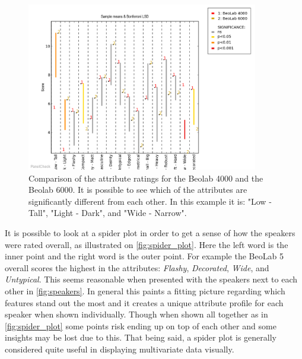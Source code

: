 \begin{figure}[H]
\centering
\includegraphics[width = 0.9\textwidth]{Figure/4000vs6000.png} 
\caption{Comparison of the attribute ratings for the Beolab 4000 and the Beolab 6000. It is possible to see which of the attributes are significantly different from each other. In this example it is: "Low - Tall", "Light - Dark", and "Wide - Narrow".}
\label{fig:4000vs6000}
\end{figure}
\newpage
\noindent
%
It is possible to look at a spider plot in order to get a sense of how the speakers were rated overall, as illustrated on \autoref{fig:spider_plot}. Here the left word is the inner point and the right word is the outer point. For example the BeoLab 5 overall scores the highest in the attributes: \textit{Flashy}, \textit{Decorated}, \textit{Wide}, and \textit{Untypical}. This seems reasonable when presented with the speakers next to each other in \autoref{fig:speakers}. In general this paints a fitting picture regarding which features stand out the most and it creates a unique attribute profile for each speaker when shown individually. Though when shown all together as in \autoref{fig:spider_plot} some points risk ending up on top of each other and some insights may be lost due to this. That being said, a spider plot is generally considered quite useful in displaying multivariate data visually. 
%
